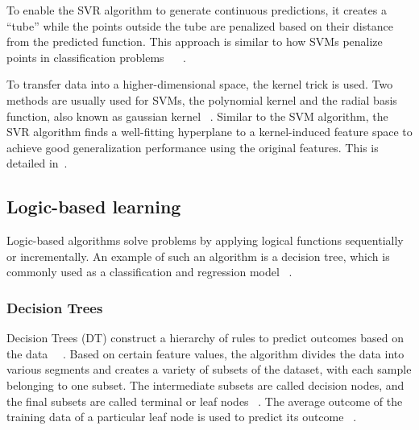 {To enable the \ac{SVR} algorithm to generate continuous predictions, it creates a ``tube''
while the points outside the tube are penalized based on their distance from the
predicted function.
This approach is similar to how \ac{SVM}s penalize points in classification
problems
~\cite[p. 369]{montesinoslopez_supportvectormachines_2022}
~\cite[pp. 67--68]{awad_efficientlearningmachines_2015}.

To transfer data into a higher-dimensional space, the kernel trick is used.
Two methods are usually used for \ac{SVM}s, the polynomial kernel and the radial basis
function, also known as gaussian kernel
~\cite[p. 97--98]{muller_introductionmachinelearning_2016}.
Similar to the \ac{SVM} algorithm, the \ac{SVR} algorithm finds a well-fitting hyperplane to a
kernel-induced feature space to achieve good generalization performance using the original
features.
This is detailed in~\cite[p. 369]{montesinoslopez_supportvectormachines_2022}.

\subsection{Logic-based learning}\label{subsec:logic-based-learning}

Logic-based algorithms solve problems by applying logical functions sequentially or
incrementally.
An example of such an algorithm is a decision tree, which is commonly used as a classification
and regression model
~\cite[p. 10]{dridi2021supervised}.

\subsubsection{Decision Trees}
Decision Trees (DT) construct a hierarchy of rules to predict outcomes based on the
data
~\cite[p. 70]{muller_introductionmachinelearning_2016}~\cite[p. 253]{shaik_briefsurveyrandom_2019}.
Based on certain feature values, the algorithm divides the data into various segments and creates a variety of
subsets of the dataset, with each sample belonging to one subset.
The intermediate subsets are called decision nodes, and the final subsets are called terminal or leaf nodes
~\cite[p. 358]{geron2022hands}.
The average outcome of the training data of a particular leaf node is used to predict its
outcome
~\cite[p. 70--72]{muller_introductionmachinelearning_2016}.

}
